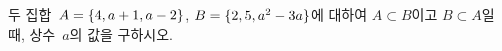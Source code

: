 두 집합~$A=\{4{,}\mkern3mu\mathopen{}a+1{,}\mkern3mu\mathopen{}a-2\}$, $B=\{2{,}\mkern3mu\mathopen{}5{,}\mkern3mu\mathopen{}a^2-3a\}$에 대하여 $A\subset B$이고 $B\subset A$일 때, 상수~$a$의 값을 구하시오.

